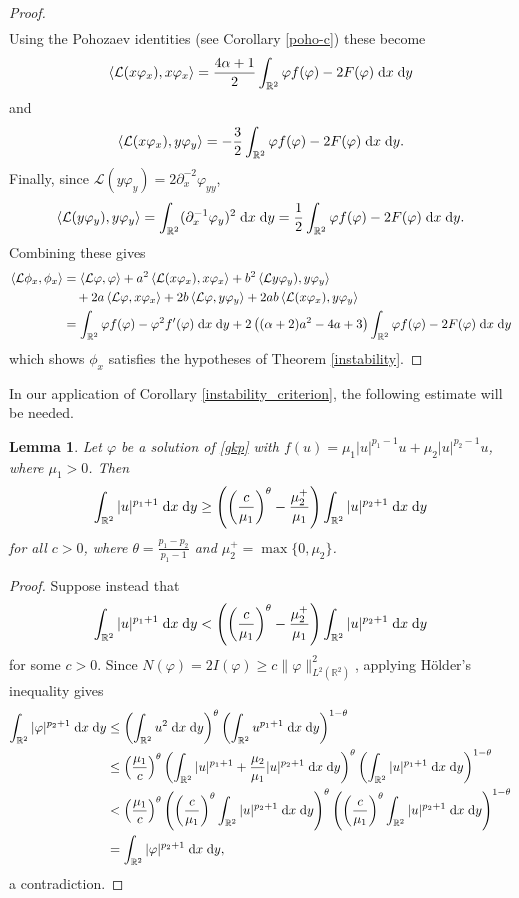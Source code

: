 \documentclass[10pt]{article}
\numberwithin{equation}{section}
\newtheorem{lemma}[theorem]{\quad Lemma}
\newcommand{\dd}{\;{\rm d}}
\newcommand{\ff}{\varphi}
\begin{document}
\begin{proof}
\begin{align*}
		\end{align*}
		Using the Pohozaev identities (see Corollary \ref{poho-c}) these become
		\[
		\left<\mathcal{L}(x\ff_x),x\ff_x\right>=\frac{4\alpha+1}{2}\int_{\mathbb R^2}\ff f(\ff)-2F(\ff)\dd x\dd y
		\]
		and
		\[
		\left<\mathcal{L}(x\ff_x),y\ff_y\right>=-\frac32\int_{\mathbb R^2}\ff f(\ff)-2F(\ff)\dd x\dd y.
		\]
		Finally, since $\mathcal{L}(y\ff_y)=2\partial_x^{-2}\ff_{yy}$, 
		\[
		\left<\mathcal{L}(y\ff_y),y\ff_y\right>
		=\int_{\mathbb R^2}(\partial_x^{-1}\ff_y)^2\dd x\dd y
		=\frac1{2}\int_{\mathbb R^2}\ff f(\ff)-2F(\ff)\dd x\dd y.
		\]
		Combining these gives
		\begin{align*}
			\left<\mathcal{L}\phi_x,\phi_x\right>&=\left<\mathcal{L}\ff,\ff\right>+a^2\left<\mathcal{L}(x\ff_x),x\ff_x\right>
			+b^2\left<\mathcal{L}y\ff_y),y\ff_y\right>\\
			&\quad+2a\left<\mathcal{L}\ff,x\ff_x\right>+2b\left<\mathcal{L}\ff,y\ff_y\right>
			+2ab\left<\mathcal{L}(x\ff_x),y\ff_y\right>\\
			&=\int_{\mathbb R^2}\ff f(\ff)-\ff^2f'(\ff)\dd x\dd y
			+2\left((\alpha+2)a^2-4a+3\right)\int_{\mathbb R^2}\ff f(\ff)-2F(\ff)\dd x\dd y
		\end{align*}
		which shows $\phi_x$ satisfies the hypotheses of Theorem \ref{instability}. 
	\end{proof}
	In our application of Corollary \ref{instability_criterion}, the following estimate will be needed. 
	\begin{lemma}\label{Lp_comparison} Let $\ff$ be a solution of \eqref{gkp} with $f(u)=\mu_1|u|^{p_1-1}u+\mu_2|u|^{p_2-1}u$, where $\mu_1>0$. Then 
		\[
		\int_{\mathbb R^2}|u|^{p_1+1}\dd x\dd y\geq\left(\left(\frac{c}{\mu_1}\right)^\theta-\frac{\mu_2^+}{\mu_1}\right)\int_{\mathbb R^2}|u|^{p_2+1}\dd x\dd y
		\]
		for all $c>0$, where $\theta=\frac{p_1-p_2}{p_1-1}$ and $\mu_2^+=\max\{0,\mu_2\}$.  
	\end{lemma}
	\vskip 10pt
	\begin{proof} Suppose instead that 
		\[
		\int_{\mathbb R^2}|u|^{p_1+1}\dd x\dd y<\left(\left(\frac{c}{\mu_1}\right)^\theta-\frac{\mu_2^+}{\mu_1}\right)\int_{\mathbb R^2}|u|^{p_2+1}\dd x\dd y
		\]
		for some $c>0$. Since $N(\ff)=2I(\ff)\geq c\|\ff\|_{L^2(\mathbb R^2)}^2$, applying H\"older's inequality gives
		\begin{align*}
			\int_{\mathbb R^2}|\ff|^{p_2+1}\dd x\dd y&\leq\left(\int_{\mathbb R^2}u^2\dd x\dd y\right)^\theta
			\left(\int_{\mathbb R^2}u^{p_1+1}\dd x\dd y\right)^{1-\theta}\\
			&\leq \left(\frac{\mu_1}{c}\right)^\theta\left(\int_{\mathbb R^2}|u|^{p_1+1}+\frac{\mu_2}{\mu_1}|u|^{p_2+1}\dd x\dd y\right)^\theta
			\left(\int_{\mathbb R^2}|u|^{p_1+1}\dd x\dd y\right)^{1-\theta}\\
			&<\left(\frac{\mu_1}{c}\right)^\theta\left(\left(\frac{c}{\mu_1}\right)^\theta
			\int_{\mathbb R^2}|u|^{p_2+1}\dd x\dd y\right)^\theta
			\left(\left(\frac{c}{\mu_1}\right)^\theta\int_{\mathbb R^2}|u|^{p_2+1}\dd x\dd y\right)^{1-\theta}\\
			&= \int_{\mathbb R^2}|\ff|^{p_2+1}\dd x\dd y,
		\end{align*}
		a contradiction. 
	\end{proof}
\end{document}
